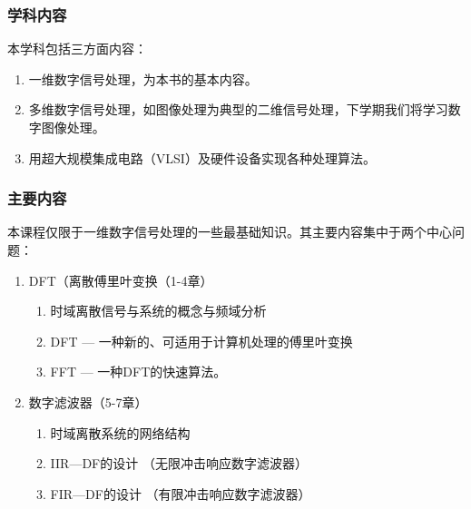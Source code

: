 \documentclass[notheorems,compress,mathserif,table]{beamer}
\begin{document}
\begin{frame}[shrink]\frametitle{学科内容}%


本学科包括三方面内容：
\begin{enumerate}
  \item
      一维数字信号处理，为本书的基本内容。
  \item
      多维数字信号处理，如图像处理为典型的二维信号处理，下学期我们将学习数字图像处理。
  \item
      用超大规模集成电路（VLSI）及硬件设备实现各种处理算法。
\end{enumerate}
\end{frame}
%
%
%
%
%
%
\begin{frame}[shrink]\frametitle{主要内容}%


本课程仅限于一维数字信号处理的一些最基础知识。其主要内容集中于两个中心问题：
\begin{enumerate}
  \item
      DFT（离散傅里叶变换（1-4章）
      \begin{enumerate}
        \item 时域离散信号与系统的概念与频域分析
        \item DFT — \qquad 一种新的、可适用于计算机处理的傅里叶变换
        \item FFT — \qquad 一种DFT的快速算法。
      \end{enumerate}
  \item
      数字滤波器（5-7章）
      \begin{enumerate}
        \item 时域离散系统的网络结构
        \item IIR—DF的设计  （无限冲击响应数字滤波器）
        \item FIR—DF的设计  （有限冲击响应数字滤波器）
      \end{enumerate}

\end{enumerate}
\end{frame}
%
%
%
%
%
%
\end{document}
